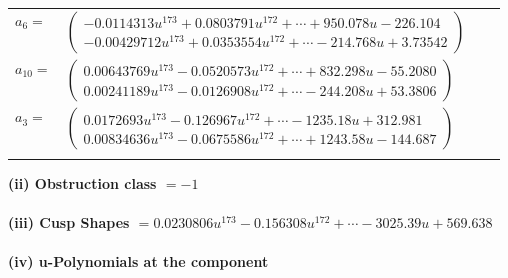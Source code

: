 \documentclass[1p]{elsarticle_modified}
\theoremstyle{definition}
\begin{document}
\begin{tabular}{m{7pt} m{180pt} m{7pt} m{180pt} }
\flushright $a_{6}=$&$\begin{pmatrix}-0.0114313 u^{173}+0.0803791 u^{172}+\cdots+950.078 u-226.104\\-0.00429712 u^{173}+0.0353554 u^{172}+\cdots-214.768 u+3.73542\end{pmatrix}$ \\
\flushright $a_{10}=$&$\begin{pmatrix}0.00643769 u^{173}-0.0520573 u^{172}+\cdots+832.298 u-55.2080\\0.00241189 u^{173}-0.0126908 u^{172}+\cdots-244.208 u+53.3806\end{pmatrix}$ \\
\flushright $a_{3}=$&$\begin{pmatrix}0.0172693 u^{173}-0.126967 u^{172}+\cdots-1235.18 u+312.981\\0.00834636 u^{173}-0.0675586 u^{172}+\cdots+1243.58 u-144.687\end{pmatrix}$\\&\end{tabular}
\flushleft \textbf{(ii) Obstruction class $= -1$}\\~\\
\flushleft \textbf{(iii) Cusp Shapes $= 0.0230806 u^{173}-0.156308 u^{172}+\cdots-3025.39 u+569.638$}\\~\\
\newpage\renewcommand{\arraystretch}{1}
\flushleft \textbf{(iv) u-Polynomials at the component}\newline \\
\end{document}
